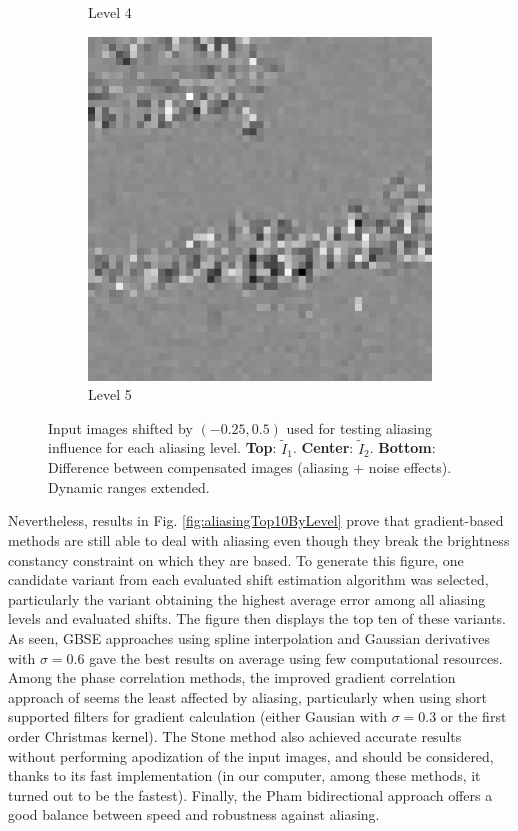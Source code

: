 \begin{figure}[t]
\begin{subfigure}{0.2\textwidth}
\caption{Level 4}
\end{subfigure}%
\begin{subfigure}{0.2\textwidth}
\includegraphics[width=\textwidth]{img/aliasedImgDifL5}
\caption{Level 5}
\end{subfigure}
\caption{Input images shifted by $(-0.25, 0.5)$ used for testing aliasing influence for each aliasing level. \textbf{Top}: $\tilde{I}_1$. \textbf{Center}: $\tilde{I}_2$. \textbf{Bottom}: Difference between compensated images (aliasing + noise effects). Dynamic ranges extended.}
\label{fig:aliasedImages}
\end{figure}

Nevertheless, results in Fig. \ref{fig:aliasingTop10ByLevel} prove that gradient-based methods are still able to deal with aliasing even though they break the brightness constancy constraint on which they are based. To generate this figure, one candidate variant from each evaluated shift estimation algorithm was selected, particularly the variant obtaining the highest average error among all aliasing levels and evaluated shifts. The figure then displays the top ten of these variants. As seen, GBSE approaches using spline interpolation and Gaussian derivatives with $\sigma=0.6$ gave the best results on average using few computational resources. Among the phase correlation methods, the improved gradient correlation approach of \cite{Tzimiropoulos2011} seems the least affected by aliasing, particularly when using short supported filters for gradient calculation (either Gausian with $\sigma=0.3$ or the first order Christmas kernel). The Stone method \cite{Stone_2001} also achieved accurate results without performing apodization of the input images, and should be considered, thanks to its fast implementation (in our computer, among these methods, it turned out to be the fastest). Finally, the Pham bidirectional approach \cite{pham2008} offers a good balance between speed and robustness against aliasing.

